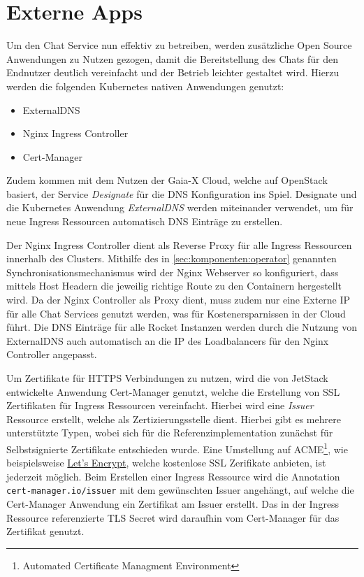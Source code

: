 \section{Externe Apps}
\label{sec:komponenten:externe-apps}

Um den Chat Service nun effektiv zu betreiben, werden zusätzliche Open Source Anwendungen zu Nutzen gezogen,
damit die Bereitstellung des Chats für den Endnutzer deutlich vereinfacht und der Betrieb leichter gestaltet wird.
Hierzu werden die folgenden Kubernetes nativen Anwendungen genutzt:
\begin{itemize}
  \item ExternalDNS
  \item Nginx Ingress Controller
  \item Cert-Manager
\end{itemize}

Zudem kommen mit dem Nutzen der Gaia-X Cloud, welche auf OpenStack basiert, der Service \emph{Designate}
für die DNS Konfiguration ins Spiel. Designate und die Kubernetes Anwendung \emph{ExternalDNS} werden miteinander
verwendet, um für neue Ingress Ressourcen automatisch DNS Einträge zu erstellen. 

Der Nginx Ingress Controller dient als Reverse Proxy für alle Ingress Ressourcen innerhalb des Clusters.
Mithilfe des in \ref{sec:komponenten:operator} genannten Synchronisationsmechanismus wird der Nginx Webserver so 
konfiguriert, dass mittels Host Headern die jeweilig richtige Route zu den Containern hergestellt wird. 
Da der Nginx Controller als Proxy dient, muss zudem nur eine Externe IP für alle Chat Services genutzt werden, was
für Kostenersparnissen in der Cloud führt. Die DNS Einträge für alle Rocket Instanzen werden durch die Nutzung 
von ExternalDNS auch automatisch an die IP des Loadbalancers für den Nginx Controller angepasst.

Um Zertifikate für HTTPS Verbindungen zu nutzen, wird die von JetStack entwickelte Anwendung Cert-Manager genutzt,
welche die Erstellung von SSL Zertifikaten für Ingress Ressourcen vereinfacht. Hierbei wird eine \emph{Issuer} Ressource
erstellt, welche als Zertizierungsstelle dient. \cite{CertManager2021} Hierbei gibt es mehrere unterstützte Typen, wobei sich
für die Referenzimplementation zunächst für Selbstsignierte Zertifikate entschieden wurde. 
Eine Umstellung auf ACME\footnote{Automated Certificate Managment Environment},
wie beispielsweise \href{https://letsencrypt.org/de/}{Let's Encrypt}, welche kostenlose SSL Zerifikate anbieten,
ist jederzeit möglich. 
Beim Erstellen einer Ingress Ressource wird die Annotation \texttt{cert-manager.io/issuer} mit dem gewünschten Issuer angehängt,
auf welche die Cert-Manager Anwendung ein Zertifikat am Issuer erstellt. 
Das in der Ingress Ressource referenzierte TLS Secret wird daraufhin vom Cert-Manager für das Zertifikat genutzt.

